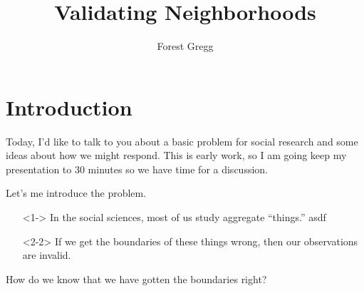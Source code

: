 \newcommand{\blackout}{
  \mode<presentation>{
    {
      \setbeamercolor{background canvas}{bg=black}
      \begin{frame}[plain]{}
      \end{frame}
    }
  }
  \mode<presentation>{
    \setbeamercolor{background canvas}{bg=white}
  }
}
\newcommand{\fullscreenimage}[1]{
  { %
    \begin{frame}[plain]
      \begin{tikzpicture}[remember picture,overlay]
        \node[at=(current page.center)] {
          \texttt{[image: \#1]}
        };
      \end{tikzpicture}
    \end{frame}
  }
}

\usepackage[english]{babel}
\usepackage{tikz}
\title{Validating Neighborhoods}
\author{Forest Gregg}

\mode*
\maketitle

\section{Introduction}
Today, I'd like to talk to you about a basic problem for social
research and some ideas about how we might respond. This is early
work, so I am going keep my presentation to 30 minutes so we have time
for a discussion.

Let's me introduce the problem.



\begin{frame}
\begin{itemize}{}
\item[]<1-> In the social sciences, most of us study aggregate ``things.'' asdf
  \pause
\item[]<2-2> If we get the boundaries of these things wrong, then our
  observations are invalid.
\end{itemize}
\end{frame}

\begin{frame}
\begin{center}
How do we know that we have gotten the boundaries right?
\end{center}
\end{frame}



